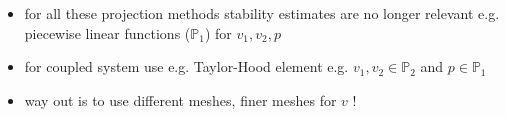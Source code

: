 \begin{itemize}
	\item for all these projection methods stability estimates are no longer relevant e.g. piecewise linear functions ($\mathbb{P}_1$) for $v_1,v_2,p$
	\item for coupled system use e.g. Taylor-Hood element e.g. $v_1,v_2 \in \mathbb{P}_2$ and $ p \in \mathbb{P}_1$
	\item way out is to use different meshes, finer meshes for $v$ !
\end{itemize}
